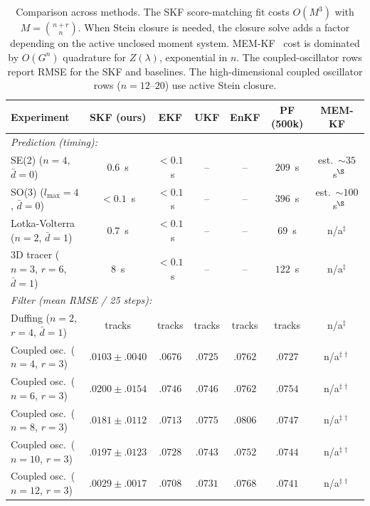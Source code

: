 \documentclass{article}
\theoremstyle{definition}
\begin{document}
\begin{table}[ht]
\caption{Comparison across methods.
The SKF score-matching fit costs $O(M^3)$ with
$M = \binom{n+r}{n}$. When Stein closure is needed, the closure solve
adds a factor depending on the active unclosed moment system.
MEM-KF~\cite{teng2025} cost is dominated by $O(G^n)$ quadrature for $Z(\lambda)$, exponential in $n$.
The coupled-oscillator rows report RMSE for the SKF and baselines.
The high-dimensional coupled oscillator rows ($n{=}12$--$20$) use
active Stein closure.}
\label{tab:comparison}
\centering
\small
\setlength{\tabcolsep}{4pt}
\begin{tabular}{lcccccc}
\toprule
\textbf{Experiment} & \textbf{SKF (ours)} & \textbf{EKF} & \textbf{UKF} & \textbf{EnKF} & \textbf{PF (500k)} & \textbf{MEM-KF} \\
\midrule
\multicolumn{7}{l}{\emph{Prediction (timing):}} \\
SE(2) ($n{=}4$, $\bar{d}{=}0$) & $0.6$~s & ${<}0.1$~s & -- & -- & $209$~s & est.\ ${\sim}35$~s$^\S$ \\
SO(3) ($l_{\max}{=}4$, $\bar{d}{=}0$) & ${<}0.1$~s & ${<}0.1$~s & -- & -- & $396$~s & est.\ ${\sim}100$~s$^\S$ \\
Lotka-Volterra ($n{=}2$, $\bar{d}{=}1$) & $0.7$~s & ${<}0.1$~s & -- & -- & $69$~s & n/a$^\ddagger$ \\
3D tracer ($n{=}3$, $r{=}6$, $\bar{d}{=}1$) & $8$~s & ${<}0.1$~s & -- & -- & $122$~s & n/a$^\ddagger$ \\
\midrule
\multicolumn{7}{l}{\emph{Filter (mean RMSE / 25 steps):}} \\
Duffing ($n{=}2$, $r{=}4$, $\bar{d}{=}1$) & tracks & tracks & tracks & tracks & tracks & n/a$^\ddagger$ \\
Coupled osc.\ ($n{=}4$, $r{=}3$) & $\mathbf{.0103\!\pm\!.0040}$ & $.0676$ & $.0725$ & $.0762$ & $.0727$ & n/a$^{\ddagger\dagger}$ \\
Coupled osc.\ ($n{=}6$, $r{=}3$) & $\mathbf{.0200\!\pm\!.0154}$ & $.0746$ & $.0746$ & $.0762$ & $.0754$ & n/a$^{\ddagger\dagger}$ \\
Coupled osc.\ ($n{=}8$, $r{=}3$) & $\mathbf{.0181\!\pm\!.0112}$ & $.0713$ & $.0775$ & $.0806$ & $.0747$ & n/a$^{\ddagger\dagger}$ \\
Coupled osc.\ ($n{=}10$, $r{=}3$) & $\mathbf{.0197\!\pm\!.0123}$ & $.0728$ & $.0743$ & $.0752$ & $.0744$ & n/a$^{\ddagger\dagger}$ \\
Coupled osc.\ ($n{=}12$, $r{=}3$) & $\mathbf{.0029\!\pm\!.0017}$ & $.0708$ & $.0731$ & $.0768$ & $.0741$ & n/a$^{\ddagger\dagger}$ \\

\end{tabular}
\end{table}
\end{document}
